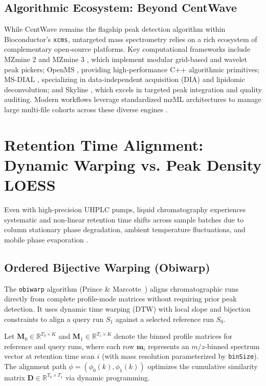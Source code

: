 \documentclass[11pt,twoside,openright]{book}
\begin{document}
\subsection{Algorithmic Ecosystem: Beyond CentWave}
While CentWave remains the flagship peak detection algorithm within Bioconductor's \texttt{xcms}, untargeted mass spectrometry relies on a rich ecosystem of complementary open-source platforms. Key computational frameworks include MZmine 2 and MZmine 3 \cite{pluskal2010mzmine, schmid2023mzmine}, which implement modular grid-based and wavelet peak pickers; OpenMS \cite{rost2016openms}, providing high-performance C++ algorithmic primitives; MS-DIAL \cite{tsugawa2015msdial}, specializing in data-independent acquisition (DIA) and lipidomic deconvolution; and Skyline \cite{maclean2010skyline}, which excels in targeted peak integration and quality auditing. Modern workflows leverage standardized mzML architectures to manage large multi-file cohorts across these diverse engines \cite{rivas2016moving, chambers2012cross}.

\section{Retention Time Alignment: Dynamic Warping vs. Peak Density LOESS}

Even with high-precision UHPLC pumps, liquid chromatography experiences systematic and non-linear retention time shifts across sample batches due to column stationary phase degradation, ambient temperature fluctuations, and mobile phase evaporation \cite{mahieu2016warping, dunn2011mass}. 

\subsection{Ordered Bijective Warping (Obiwarp)}

The \texttt{obiwarp} algorithm (Prince \& Marcotte~\cite{prince2006chromatographic}) aligns chromatographic runs directly from complete profile-mode matrices without requiring prior peak detection. It uses dynamic time warping (DTW) with local slope and bijection constraints to align a query run $S_1$ against a selected reference run $S_0$.

Let $\mathbf{M}_0 \in \mathbb{R}^{T_0 \times K}$ and $\mathbf{M}_1 \in \mathbb{R}^{T_1 \times K}$ denote the binned profile matrices for reference and query runs, where each row $\mathbf{m}_i$ represents an $m/z$-binned spectrum vector at retention time scan $i$ (with mass resolution parameterized by \texttt{binSize}). The alignment path $\phi = (\phi_0(k), \phi_1(k))$ optimizes the cumulative similarity matrix $\mathbf{D} \in \mathbb{R}^{T_0 \times T_1}$ via dynamic programming.
\end{document}
